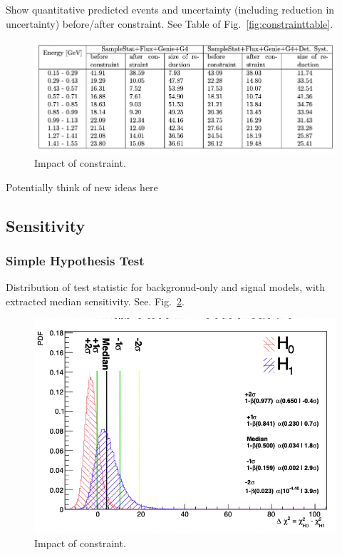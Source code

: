 Show quantitative predicted events and uncertainty (including reduction in uncertainty) before/after constraint. See Table of Fig.~\ref{fig:constrainttable}.

\begin{center}
\begin{figure}
    \includegraphics[width=1.00\textwidth]{technote/SystematicsSensitivity/Figures/constrainttable.png}
    \caption{Impact of constraint.}
    \label{fig:constraint} 
\end{figure}
\end{center}

Potentially think of new ideas here

\newpage
\subsection{Sensitivity}
\label{sec:sensitivity}

\subsubsection{Simple Hypothesis Test}

Distribution of test statistic for backgronud-only and signal models, with extracted median sensitivity. See. Fig.~\ref{fig:simplehypothesis}.

\begin{center}
\begin{figure}[h]
    \includegraphics[width=1.00\textwidth]{technote/SystematicsSensitivity/Figures/simplehypothesis.png}
    \caption{Impact of constraint.}
    \label{fig:simplehypothesis} 
\end{figure}
\end{center}

